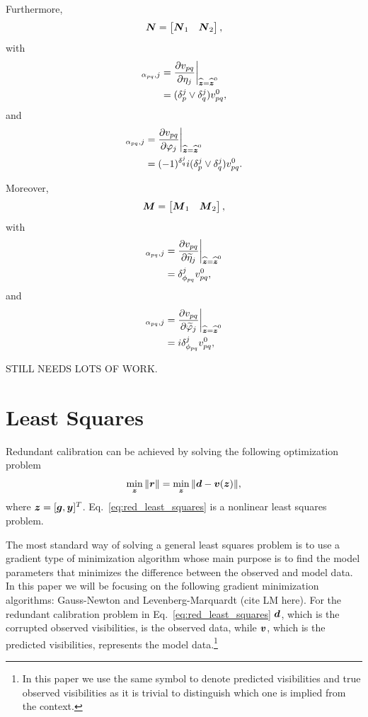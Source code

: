 \documentclass[useAMS,usenatbib]{mn2e}
\newcommand{\bz}{\bmath{z}}
\newcommand{\br}{\bmath{r}}
\newcommand{\bg}{\bmath{g}}
\newcommand{\bd}{\bmath{d}}
\newcommand{\bv}{\bmath{v}}
\newcommand{\by}{\bmath{y}}
\newcommand{\bN}{\bmath{N}}
\newcommand{\bM}{\bmath{M}}
\begin{document}
Furthermore, 
\begin{equation}
\bN = \begin{bmatrix}
      \bN_1 & \bN_2 
      \end{bmatrix},
\end{equation}
with 
\begin{align}
[\bN_1]_{\alpha_{pq},j} &= \frac{\partial v_{pq}}{\partial \eta_j} {\bigg |}_{\widehat{\bz}=\widehat{\bz}^0}\\
&= (\delta_{p}^{j}\vee\delta_{q}^{j}) v_{pq}^0,
\end{align}
and
\begin{align}
 [\bN_2]_{\alpha_{pq},j} &= \frac{\partial v_{pq}}{\partial \varphi_j} {\bigg |}_{\widehat{\bz}=\widehat{\bz}^0}\\
 &= (-1)^{\delta_{q}^{j}}i(\delta_{p}^{j}\vee\delta_{q}^{j}) v_{pq}^0. 
\end{align}

Moreover,
\begin{equation}
\bM = \begin{bmatrix}
      \bM_1 & \bM_2 
      \end{bmatrix},
\end{equation}
with
\begin{align}
[\bM_1]_{\alpha_{pq},j} &= \frac{\partial v_{pq}}{\partial \widetilde{\eta}_j} {\bigg |}_{\widehat{\bz}=\widehat{\bz}^0}\\
&=  \delta_{\phi_{pq}}^{j} v_{pq}^0,
\end{align}
and
\begin{align}
[\bM_2]_{\alpha_{pq},j} &= \frac{\partial v_{pq}}{\partial \widetilde{\varphi}_j} {\bigg |}_{\widehat{\bz}=\widehat{\bz}^0}\\
&= i\delta_{\phi_{pq}}^{j} v_{pq}^0,
\end{align}

STILL NEEDS LOTS OF WORK.

\section{Least Squares}
Redundant calibration can be achieved by solving the following optimization problem
\begin{equation}
\label{eq:red_least_squares}
\min_{\bz} \|\br\| = \min_{\bz} \|\bd - \bv(\bz)\|, 
\end{equation}
where $\bz = [\bg,\by]^T$. Eq.~\eqref{eq:red_least_squares} is a nonlinear least squares problem.

The most standard way of solving a general least squares problem is to use a gradient type of minimization algorithm whose main purpose is to find the model parameters that 
minimizes the difference between the observed and model data. In this paper we will be focusing on the following gradient minimization algorithms: Gauss-Newton and Levenberg-Marquardt (cite LM here). For the redundant calibration problem in Eq.~\eqref{eq:red_least_squares} $\bd$, which is the corrupted observed visibilities, is the observed data,
while $\bv$, which is the predicted visibilities, represents the model data.\footnote{In this paper we use the same symbol to denote predicted visibilities and true observed visibilities as it
is trivial to distinguish which one is implied from the context.}   
\end{document}
